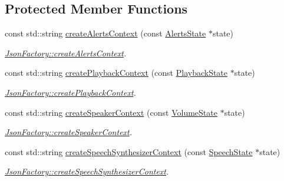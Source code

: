 \subsection*{Protected Member Functions}
\begin{DoxyCompactItemize}
\item 
const std\+::string \hyperlink{classAVSJson_1_1JsonFactory_aa6aab87bcc8fcb68add7dc86fac36bf0}{create\+Alerts\+Context} (const \hyperlink{structAVSJson_1_1AlertsState}{Alerts\+State} $\ast$state)
\begin{DoxyCompactList}\small\item\em \hyperlink{classAVSJson_1_1JsonFactory_aa6aab87bcc8fcb68add7dc86fac36bf0}{Json\+Factory\+::create\+Alerts\+Context}. \end{DoxyCompactList}\item 
const std\+::string \hyperlink{classAVSJson_1_1JsonFactory_afa83d7cfe2079159f3f8923d0ad82cf2}{create\+Playback\+Context} (const \hyperlink{structAVSJson_1_1PlaybackState}{Playback\+State} $\ast$state)
\begin{DoxyCompactList}\small\item\em \hyperlink{classAVSJson_1_1JsonFactory_afa83d7cfe2079159f3f8923d0ad82cf2}{Json\+Factory\+::create\+Playback\+Context}. \end{DoxyCompactList}\item 
const std\+::string \hyperlink{classAVSJson_1_1JsonFactory_af36d05a150eaccfe398f5c128298eab5}{create\+Speaker\+Context} (const \hyperlink{structAVSJson_1_1VolumeState}{Volume\+State} $\ast$state)
\begin{DoxyCompactList}\small\item\em \hyperlink{classAVSJson_1_1JsonFactory_af36d05a150eaccfe398f5c128298eab5}{Json\+Factory\+::create\+Speaker\+Context}. \end{DoxyCompactList}\item 
const std\+::string \hyperlink{classAVSJson_1_1JsonFactory_ab83af75c1e25cf954843b823c9eefa93}{create\+Speech\+Synthesizer\+Context} (const \hyperlink{structAVSJson_1_1SpeechState}{Speech\+State} $\ast$state)
\begin{DoxyCompactList}\small\item\em \hyperlink{classAVSJson_1_1JsonFactory_ab83af75c1e25cf954843b823c9eefa93}{Json\+Factory\+::create\+Speech\+Synthesizer\+Context}. \end{DoxyCompactList}\item 
\mbox{\label{classAVSJson_1_1JsonFactory_a79face8e4a5a7a21cf9ed6bbcecf7685}} 

\end{DoxyCompactItemize}
